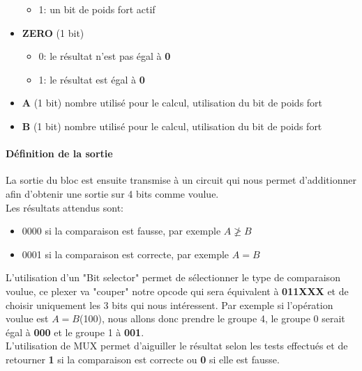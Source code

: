 \documentclass[a4paper]{article}
\begin{document}
\begin{tcolorbox}[colframe=Monokaimagenta,colback=white]
\begin{itemize}
\begin{itemize}
            \item 1: un bit de poids fort actif
        \end{itemize}
\item \textbf{ZERO} (1 bit) 
    \begin{itemize}
            \item 0: le résultat n'est pas égal à \textbf{0}
            \item 1: le résultat est égal à \textbf{0}
        \end{itemize}
\item \textbf{A} (1 bit) nombre utilisé pour le calcul, utilisation du bit de poids fort
\item \textbf{B} (1 bit) nombre utilisé pour le calcul, utilisation du bit de poids fort
\end{itemize}

\paragraph{Définition de la sortie}
La sortie du bloc est ensuite transmise à un circuit qui nous permet d'additionner afin d'obtenir une sortie sur 4 bits comme voulue.\\
Les résultats attendus sont: 
\begin{itemize}
 \item    0000 si la comparaison est fausse, par exemple $A \ngeq B$
 \item    0001 si la comparaison est correcte, par exemple $A = B$
\end{itemize}
L'utilisation d'un "Bit selector" permet de sélectionner le type de comparaison voulue, ce plexer va "couper" notre opcode qui sera équivalent à \textbf{011XXX} et de choisir uniquement les 3 bits qui nous intéressent. Par exemple si l'opération voulue est $A=B$(100), nous allons donc prendre le groupe 4, le groupe 0 serait égal à \textbf{000} et le groupe 1 à \textbf{001}.\\
L'utilisation de MUX permet d'aiguiller le résultat selon les tests effectués et de retourner \textbf{1} si la comparaison est correcte ou \textbf{0} si elle est fausse.

\end{tcolorbox}
\end{document}
